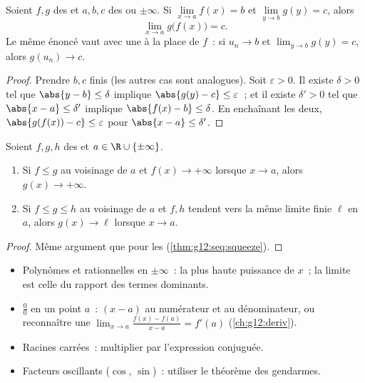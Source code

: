 \begin{theorem}\label{thm:g12:limcont:composition}
Soient $f, g$ des  et $a, b, c$ des  ou $\pm\infty$.
Si $\lim\limits_{x \to a} f(x) = b$ et $\lim\limits_{y \to b} g(y) = c$,
alors
\[
\lim_{x \to a} g\bigl(f(x)\bigr) = c .
\]
Le même énoncé vaut avec une  à la place de $f$~: si $u_n \to b$ et
$\lim_{y\to b} g(y) = c$, alors $g(u_n) \to c$.
\end{theorem}

\begin{proof}
Prendre $b, c$ finis (les autres cas sont analogues). Soit
$\varepsilon > 0$. Il existe $\delta > 0$ tel que $\abs{y - b} \leq \delta$
implique $\abs{g(y) - c} \leq \varepsilon$~; et il existe $\delta' > 0$ tel
que $\abs{x - a} \leq \delta'$ implique $\abs{f(x) - b} \leq \delta$. En
enchaînant les deux, $\abs{g(f(x)) - c} \leq \varepsilon$ pour
$\abs{x - a} \leq \delta'$.
\end{proof}

\begin{theorem}\label{thm:g12:limcont:squeeze}
Soient $f, g, h$ des  et $a \in \R \cup \{\pm\infty\}$.
\begin{enumerate}
  \item Si $f \leq g$ au voisinage de $a$ et $f(x) \to +\infty$ lorsque
        $x \to a$, alors $g(x) \to +\infty$.
  \item Si $f \leq g \leq h$ au voisinage de $a$ et $f, h$ tendent vers la
        même limite finie $\ell$ en $a$, alors $g(x) \to \ell$ lorsque
        $x \to a$.
\end{enumerate}
\end{theorem}

\begin{proof}
Même argument que pour les  (\cref{thm:g12:seq:squeeze}).
\end{proof}

\begin{method}\label{met:g12:limcont:limits}
\begin{itemize}
  \item Polynômes et  rationnelles en $\pm\infty$~:  la
        plus haute puissance de $x$~; la limite est celle du rapport des
        termes dominants.
  \item $\frac{0}{0}$ en un point $a$~:  $(x-a)$ au numérateur et
        au dénominateur, ou reconnaître une 
        $\lim_{x\to a}\frac{f(x)-f(a)}{x-a} = f'(a)$
        (\cref{ch:g12:deriv}).
  \item Racines carrées~: multiplier par l'expression conjuguée.
  \item Facteurs oscillants ($\cos$, $\sin$)~: utiliser le théorème des
        gendarmes.
\end{itemize}
\end{method}

